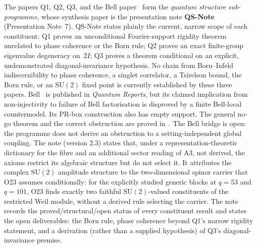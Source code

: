 \documentclass[11pt,a4paper]{article}
\newcommand{\SU}{\mathrm{SU}}
\begin{document}
    The papers Q1, Q2, Q3, and the Bell paper~\cite{Beau2026b} form the \emph{quantum structure
  sub-programme}, whose synthesis paper is the presentation note
    \textbf{QS-Note}~\cite{Beau2026qsnote} (Presentation Note~7).
    QS-Note states plainly the current, narrow scope of each constituent: Q1 proves an
    unconditional Fourier-support rigidity theorem unrelated to phase coherence or the Born rule;
    Q2 proves an exact finite-group eigenvalue degeneracy on~$2I$; Q3 proves a theorem
    conditional on an explicit, undemonstrated diagonal-invariance hypothesis. No chain from
    Born--Infeld indiscernibility to phase coherence, a singlet correlator, a Tsirelson bound, the
    Born rule, or an $\SU(2)$ fixed point is currently established by these three papers.
    Bell~\cite{Beau2026b} is published in \emph{Quantum Reports}, but its claimed implication
    from non-injectivity to failure of Bell factorisation is disproved by a finite Bell-local
    countermodel. Its PR-box construction also has empty support. The general no-go theorem and
    the correct obstruction are proved in~\cite{Beau2026BellNoGo}. The Bell bridge is open:
    the programme does not derive an obstruction to a setting-independent global coupling.
    The note (version 2.3) states that, under a representation-theoretic dictionary for the fibre and an additional
    sector reading of A3, not derived, the axioms restrict its algebraic structure but do not select it.
    It attributes the complex $\SU(2)$ amplitude structure to the two-dimensional spinor carrier that O23 assumes
    conditionally: for the explicitly studied generic blocks at $q = 53$ and $q = 101$, O23 finds exactly two
    faithful $\SU(2)$-valued constituents of the restricted Weil module, without a derived rule selecting the
    carrier.
    The note records the proved/structural/open status of every constituent result and states
    the open deliverables: the Born rule, phase coherence beyond Q1's narrow rigidity statement,
    and a derivation (rather than a supplied hypothesis) of Q3's diagonal-invariance premise.
\end{document}
